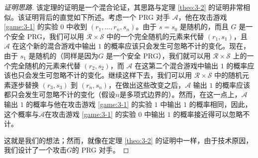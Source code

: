 \begin{proof}[证明思路]
该定理的证明是一个混合论证，其思路与定理 \ref{theo:3-2} 的证明非常相似。该证明背后的直觉如下所述。考虑一个 PRG 对手 $\mathcal A$，他在攻击游戏 \ref{game:3-1} 的实验 $0$ 中收到 $(r_1,\dots,r_n,s_n)$。由于 $s=s_0$ 是随机的，而且 $G$ 是一个安全 PRG，我们可以用 $\mathcal{R}\times\mathcal{S}$ 中的一个完全随机的元素来代替 $(r_1,s_1)$，且 $\mathcal A$ 在这个新的混合游戏中输出 $1$ 的概率应该只会发生可忽略不计的变化。现在，由于 $s_1$ 是随机的（同样是因为$G$ 是一个安全 PRG），我们就可以用 $\mathcal{R}\times\mathcal{S}$ 上的一个完全随机的元素来代替 $(r_2,s_2)$，而 $\mathcal A$ 在这第二个混合游戏中输出 $1$ 的概率应该也只会发生可忽略不计的变化。继续这样下去，我们可以用 $\mathcal{R}\times\mathcal{S}$ 中的随机元素逐步替换 $(r_3,s_3)$ 到 $(r_n,s_n)$，在做出这些改变之后，$\mathcal A$ 输出 $1$ 的概率应该都只会发生可忽略不计的变化（假设$n$是多项式边界的）。然而，在这一点上，$\mathcal A$ 输出 $1$ 的概率与他在攻击游戏 \ref{game:3-1} 的实验 $1$ 中输出 $1$ 的概率相同，因此，这个概率与$\mathcal A$在攻击游戏 \ref{game:3-1} 的实验 $0$ 中输出 $1$ 的概率接近得可以忽略不计。

这就是我们的想法；然而，就像在定理 \ref{theo:3-2} 的证明中一样，由于技术原因，我们设计了一个攻击$G$的 PRG 对手。
\end{proof}

